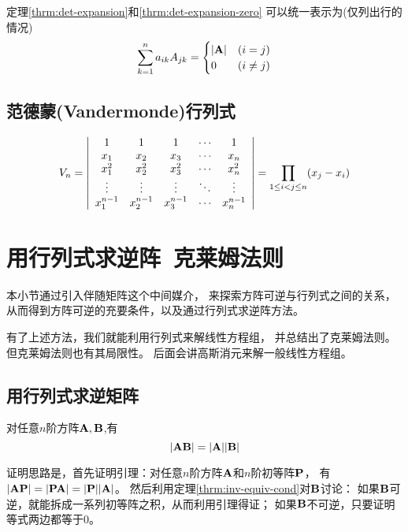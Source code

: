 \begin{remark}
  定理\ref{thrm:det-expansion}和\ref{thrm:det-expansion-zero}
  可以统一表示为(仅列出行的情况)
  \begin{displaymath}
  \sum_{k=1}^{n}a_{ik}A_{jk} = \begin{cases}
    |\mmA| & (i=j) \\
    0      & (i\neq j)
  \end{cases}
  \end{displaymath}
\end{remark}

\subsection{范德蒙(Vandermonde)行列式}
\begin{displaymath}
  V_n = \mdet{ccccc}{
    1         & 1         & 1         & \cdots & 1      \\
    x_1       & x_2       & x_3       & \cdots & x_n    \\
    x_1^2     & x_2^2     & x_3^2     & \cdots & x_n^2  \\
    \vdots    & \vdots    & \vdots    & \ddots & \vdots \\
    x_1^{n-1} & x_2^{n-1} & x_3^{n-1} & \cdots & x_n^{n-1}
  } = \prod_{1\le i<j\le n}(x_j - x_i)
\end{displaymath}

\section{用行列式求逆阵\ 克莱姆法则}
本小节通过引入伴随矩阵这个中间媒介，
来探索方阵可逆与行列式之间的关系，
从而得到方阵可逆的充要条件，以及通过行列式求逆阵方法。

有了上述方法，我们就能利用行列式来解线性方程组，
并总结出了克莱姆法则。但克莱姆法则也有其局限性。
后面会讲高斯消元来解一般线性方程组。

\subsection{用行列式求逆矩阵}
\begin{theorem}[行列式乘法规则] \label{thrm:det-mul}
  对任意$n$阶方阵$\mmA,\mmB$,有
  \[ |\mmA\mmB|=|\mmA||\mmB| \]
\end{theorem}

\begin{remark}
  证明思路是，首先证明引理：对任意$n$阶方阵$\mmA$和$n$阶初等阵$\mmP$，
  有$|\mmA\mmP|=|\mmP\mmA|=|\mmP||\mmA|$。
  然后利用定理\ref{thrm:inv-equiv-cond}对$\mmB$讨论：
  如果$\mmB$可逆，就能拆成一系列初等阵之积，从而利用引理得证；
  如果$\mmB$不可逆，只要证明等式两边都等于0。
\end{remark}


